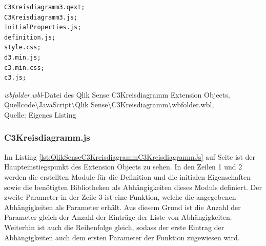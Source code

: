 \ifIncludeFigures\begin{listing}[htbp]
\begin{verbatim}
C3Kreisdiagramm3.qext;
C3Kreisdiagramm3.js;
initialProperties.js;
definition.js;
style.css;
d3.min.js;
c3.min.css;
c3.js;
\end{verbatim}
\caption[\textit{wbfolder.wbl}-Datei des Qlik Sense C3Kreisdiagramm Extension Objects ]{\textit{wbfolder.wbl}-Datei des Qlik Sense C3Kreisdiagramm Extension Objects, \\Quellcode\textbackslash{}JavaScript\textbackslash{}Qlik Sense\textbackslash{}C3Kreisdiagramm\textbackslash{}wbfolder.wbl, \\Quelle: Eigenes Listing}
\label{lst:QlikSenseC3KreisdiagrammWbfolderWblDatei}
\end{listing}\fi

\subsubsection{C3Kreisdiagramm.js}
\label{lab:C3KreisdiagrammJs} 

Im Listing \ref{lst:QlikSenseC3KreisdiagrammC3KreisdiagrammJs} auf Seite \pageref{lst:QlikSenseC3KreisdiagrammC3KreisdiagrammJs} ist der Haupteinstiegspunkt des Extension Objects zu sehen. In den Zeilen 1 und 2 werden die erstellten Module für die Definition und die initialen Eigenschaften sowie die benötigten Bibliotheken als Abhängig\-keiten dieses Moduls definiert. Der zweite Parameter in der Zeile 3 ist eine Funktion, welche die angegebenen Abhängig\-keiten als Parameter erhält. Aus diesem Grund ist die Anzahl der Parameter gleich der Anzahl der Einträge der Liste von Abhängig\-keiten. Weiterhin ist auch die Reihenfolge gleich, sodass der erste Eintrag der Abhängig\-keiten auch dem ersten Parameter der Funktion zugewiesen wird.

